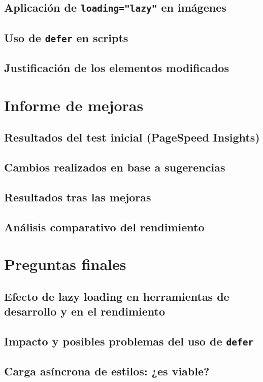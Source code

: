 \documentclass{article}
\begin{document}
\subsection{Aplicación de \texttt{loading="lazy"} en imágenes}\label{subsec:loading-lazy}

\subsection{Uso de \texttt{defer} en scripts}\label{subsec:defer-en-scripts}

\subsection{Justificación de los elementos modificados}\label{subsec:justificacion}

\section{Informe de mejoras}\label{sec:informe-de-mejoras}

\subsection{Resultados del test inicial (PageSpeed Insights)}\label{subsec:resultados-del-test-inicial}

\subsection{Cambios realizados en base a sugerencias}\label{subsec:cambios-realizados}

\subsection{Resultados tras las mejoras}\label{subsec:resultados-tras-las-mejoras}

\subsection{Análisis comparativo del rendimiento}\label{subsec:analisis-comparativo}

\section{Preguntas finales}\label{sec:preguntas-finales}

\subsection{Efecto de lazy loading en herramientas de desarrollo y en el rendimiento}\label{subsec:efecto-de-lazy-loading}

\subsection{Impacto y posibles problemas del uso de \texttt{defer}}\label{subsec:impacto-y-problemas-de-defer}

\subsection{Carga asíncrona de estilos: ¿es viable?}\label{subsec:carga-asincrona-de-estilos}
\end{document}
